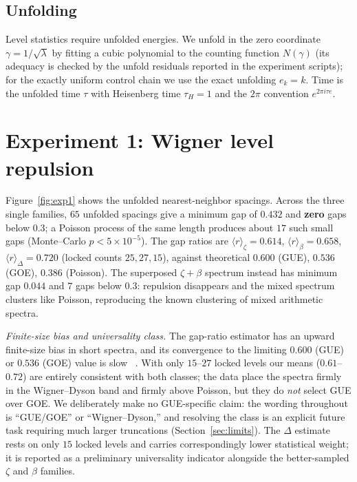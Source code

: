 \documentclass[aps,prx,reprint,floatfix]{revtex4-2}
\begin{document}
\subsection{Unfolding}
Level statistics require unfolded energies. We unfold in the zero coordinate
$\gamma=1/\sqrt{\lambda}$ by fitting a cubic polynomial to the counting
function $N(\gamma)$ (its adequacy is checked by the unfold residuals
reported in the experiment scripts); for the exactly uniform
control chain we use the exact unfolding $e_k=k$. Time is the unfolded time
$\tau$ with Heisenberg time $\tau_H=1$ and the $2\pi$ convention
$e^{2\pi i\tau e}$.

\section{Experiment 1: Wigner level repulsion}
\label{sec:exp1}

Figure~\ref{fig:exp1} shows the unfolded nearest-neighbor spacings. Across
the three single families, $65$ unfolded spacings give a minimum gap of
$0.432$ and \textbf{zero} gaps below $0.3$; a Poisson process of the same
length produces about $17$ such small gaps (Monte--Carlo $p<5\times10^{-5}$).
The gap ratios are $\langle r\rangle_\zeta=0.614$,
$\langle r\rangle_\beta=0.658$, $\langle r\rangle_\Delta=0.720$
(locked counts $25,27,15$), against theoretical $0.600$ (GUE), $0.536$ (GOE),
$0.386$ (Poisson). The superposed $\zeta+\beta$ spectrum instead has minimum
gap $0.044$ and $7$ gaps below $0.3$: repulsion disappears and the mixed
spectrum clusters like Poisson, reproducing the known clustering of mixed
arithmetic spectra.

\noindent\emph{Finite-size bias and universality class.} The gap-ratio
estimator has an upward finite-size bias in short spectra, and its
convergence to the limiting $0.600$ (GUE) or $0.536$ (GOE) value is slow
~\cite{atas2013}. With only $15$--$27$ locked levels our means
($0.61$--$0.72$) are entirely consistent with both classes; the data place
the spectra firmly in the Wigner--Dyson band and firmly above Poisson, but
they do \emph{not} select GUE over GOE. We deliberately make no
GUE-specific claim: the wording throughout is ``GUE/GOE'' or
``Wigner--Dyson,'' and resolving the class is an explicit future task
requiring much larger truncations (Section~\ref{sec:limits}). The
$\Delta$ estimate rests on only $15$ locked levels and carries
correspondingly lower statistical weight; it is reported as a preliminary
universality indicator alongside the better-sampled $\zeta$ and $\beta$
families.
\end{document}
